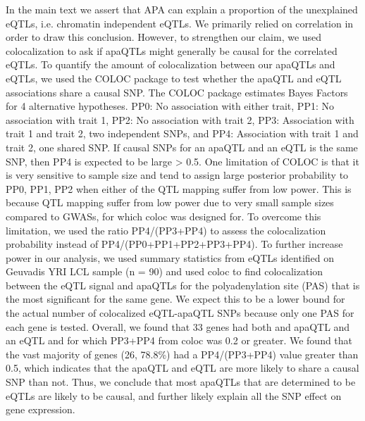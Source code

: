 In the main text we assert that APA can explain a proportion of the unexplained eQTLs, i.e. chromatin independent eQTLs. We primarily relied on correlation in order to draw this conclusion. However, to strengthen our claim, we used colocalization to ask if apaQTLs might generally be causal for the correlated eQTLs. To quantify the amount of colocalization between our apaQTLs and eQTLs, we used the COLOC package to test whether the apaQTL and eQTL associations share a causal SNP. The COLOC package estimates Bayes Factors for 4 alternative hypotheses. PP0: No association with either trait, PP1: No association with trait 1, PP2: No association with trait 2, PP3: Association with trait 1 and trait 2, two independent SNPs, and PP4: Association with trait 1 and trait 2, one shared SNP. If causal SNPs for an apaQTL and an eQTL is the same SNP, then PP4 is expected to be large > 0.5. One limitation of COLOC is that it is very sensitive to sample size and tend to assign large posterior probability to PP0, PP1, PP2 when either of the QTL mapping suffer from low power. This is because QTL mapping suffer from low power due to very small sample sizes compared to GWASs, for which coloc was designed for. To overcome this limitation, we used the ratio PP4/(PP3+PP4) to assess the colocalization probability instead of PP4/(PP0+PP1+PP2+PP3+PP4). To further increase power in our analysis, we used summary statistics from eQTLs identified on Geuvadis YRI LCL sample (n = 90) and used coloc to find colocalization between the eQTL signal and apaQTLs for the polyadenylation site (PAS) that is the most significant for the same gene. We expect this to be a lower bound for the actual number of colocalized eQTL-apaQTL SNPs because only one PAS for each gene is tested. Overall, we found that 33 genes had both and apaQTL and an eQTL and for which PP3+PP4 from coloc was 0.2 or greater. We found that the vast majority of genes (26, 78.8\%) had a PP4/(PP3+PP4) value greater than 0.5, which indicates that the apaQTL and eQTL are more likely to share a causal SNP than not. Thus, we conclude that most apaQTLs that are determined to be eQTLs are likely to be causal, and further likely explain all the SNP effect on gene expression.


